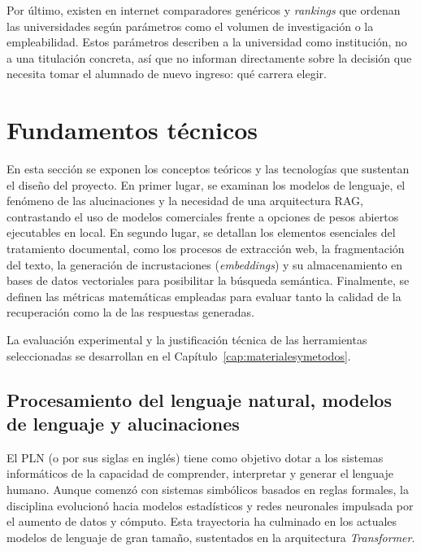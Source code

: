 Por último, existen en internet comparadores genéricos y \textit{rankings} que ordenan las universidades según parámetros como el volumen de investigación o la empleabilidad. Estos parámetros describen a la universidad como institución, no a una titulación concreta, así que no informan directamente sobre la decisión que necesita tomar el alumnado de nuevo ingreso: qué carrera elegir.


\section[Fundamentos técnicos]{Fundamentos técnicos}
\label{secc:estado_arte}


En esta sección se exponen los conceptos teóricos y las tecnologías que sustentan el diseño del proyecto. En primer lugar, se examinan los modelos de lenguaje, el fenómeno de las alucinaciones y la necesidad de una arquitectura RAG, contrastando el uso de modelos comerciales frente a opciones de pesos abiertos ejecutables en local. En segundo lugar, se detallan los elementos esenciales del tratamiento documental, como los procesos de extracción web, la fragmentación del texto, la generación de incrustaciones (\textit{embeddings}) y su almacenamiento en bases de datos vectoriales para posibilitar la búsqueda semántica. Finalmente, se definen las métricas matemáticas empleadas para evaluar tanto la calidad de la recuperación como la de las respuestas generadas.

La evaluación experimental y la justificación técnica de las herramientas seleccionadas se desarrollan en el Capítulo~\ref{cap:materialesymetodos}.

\subsection{Procesamiento del lenguaje natural, modelos de lenguaje y alucinaciones}


El PLN (o  por sus siglas en inglés) tiene como objetivo dotar a los sistemas informáticos de la capacidad de comprender, interpretar y generar el lenguaje humano\cite{jurafsky2026slp3}. Aunque comenzó con sistemas simbólicos basados en reglas formales\cite{chomsky1957syntactic}, la disciplina evolucionó hacia modelos estadísticos y redes neuronales impulsada por el aumento de datos y cómputo\cite{hirschberg2015advances}. Esta trayectoria ha culminado en los actuales modelos de lenguaje de gran tamaño\cite{delso2024evolucion}, sustentados en la arquitectura \textit{Transformer}.


